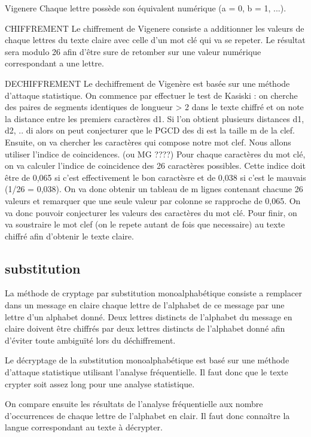 \documentclass[a4]{article}
\begin{document}
Vigenere
Chaque lettre possède son équivalent numérique (a = 0, b = 1, ...).

CHIFFREMENT
Le chiffrement de Vigenere consiste a additionner les valeurs de chaque lettres du texte claire avec celle d'un mot clé
qui va se repeter. Le résultat sera modulo 26 afin d'être sure de retomber sur une valeur numérique correspondant a une lettre.


DECHIFFREMENT
Le dechiffrement de Vigenère est basée sur une méthode d'attaque statistique.
On commence par effectuer le test de Kasiski : on cherche des paires de segments identiques de longueur > 2 dans le texte chiffré et on note la distance entre les premiers caractères d1. Si l'on obtient plusieurs distances d1, d2, .. di alors
on peut conjecturer que le PGCD des di est la taille m de la clef.
Ensuite, on va chercher les caractères qui compose notre mot clef. Nous allons utiliser l'indice de coincidences. (ou MG ????)
Pour chaque caractères du mot clé, on va calculer l'indice de coincidence des 26 caractères possibles.
Cette indice doit être de 0,065 si c'est effectivement le bon caractèsre et de 0,038 si c'est le mauvais (1/26 = 0,038).
On va donc obtenir un tableau de m lignes contenant chacune 26 valeurs et remarquer que une seule valeur par colonne se
rapproche de 0,065.
On va donc pouvoir conjecturer les valeurs des caractères du mot clé.
Pour finir, on va soustraire le mot clef (on le repete autant de fois que necessaire) au texte chiffré afin d'obtenir le texte claire.
		\subsection{substitution}
			La méthode de cryptage par substitution  monoalphabétique consiste a remplacer dans un message en claire chaque lettre de l’alphabet de ce message par une lettre d’un alphabet donné. Deux lettres distincts de l’alphabet du message en claire doivent être chiffrés par deux lettres distincts de l’alphabet donné afin d’éviter toute ambiguïté lors du déchiffrement.
	
	Le  décryptage de la substitution monoalphabétique est basé sur une  méthode d’attaque statistique utilisant l’analyse fréquentielle. Il faut donc que le texte crypter soit assez long pour une analyse statistique.

	On compare ensuite les résultats de l’analyse fréquentielle aux nombre d’occurrences
de chaque lettre de l’alphabet en clair. Il faut donc connaître la langue correspondant au texte à décrypter. 
\end{document}
